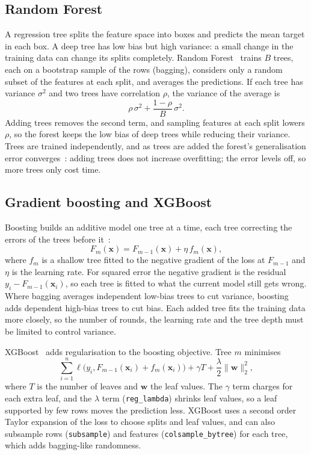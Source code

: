 \subsection{Random Forest}
A regression tree splits the feature space into boxes and predicts the mean
target in each box. A deep tree has low bias but high variance: a small
change in the training data can change its splits completely. Random
Forest~\cite{breiman2001rf} trains $B$ trees, each on a bootstrap sample of
the rows (bagging), considers only a random subset of the features at each
split, and averages the predictions. If each tree has variance $\sigma^2$
and two trees have correlation $\rho$, the variance of the average is
\begin{equation}
\rho\,\sigma^2 + \frac{1-\rho}{B}\,\sigma^2 .
\end{equation}
Adding trees removes the second term, and sampling features at each split
lowers $\rho$, so the forest keeps the low bias of deep trees while
reducing their variance. Trees are trained independently, and as trees
are added the forest's generalisation error converges~\cite{breiman2001rf}:
adding trees does not increase overfitting; the error levels off, so more
trees only cost time.

\subsection{Gradient boosting and XGBoost}
Boosting builds an additive model one tree at a time, each tree correcting
the errors of the trees before it~\cite{friedman2001gbm}:
\begin{equation}
F_m(\mathbf{x}) = F_{m-1}(\mathbf{x}) + \eta\, f_m(\mathbf{x}),
\end{equation}
where $f_m$ is a shallow tree fitted to the negative gradient of the loss
at $F_{m-1}$ and $\eta$ is the learning rate. For squared error the
negative gradient is the residual $y_i - F_{m-1}(\mathbf{x}_i)$, so each
tree is fitted to what the current model still gets wrong. Where bagging
averages independent low-bias trees to cut variance, boosting adds
dependent high-bias trees to cut bias. Each added tree fits the training
data more closely, so the number of rounds, the learning rate and the tree
depth must be limited to control variance.

XGBoost~\cite{chen2016xgboost} adds regularisation to the boosting
objective. Tree $m$ minimises
\begin{equation}
\sum_{i=1}^{n} \ell\bigl(y_i, F_{m-1}(\mathbf{x}_i) + f_m(\mathbf{x}_i)\bigr)
+ \gamma T + \frac{\lambda}{2}\lVert\mathbf{w}\rVert_2^2 ,
\end{equation}
where $T$ is the number of leaves and $\mathbf{w}$ the leaf values. The
$\gamma$ term charges for each extra leaf, and the $\lambda$ term
(\texttt{reg\_lambda}) shrinks leaf values, so a leaf supported by few rows
moves the prediction less. XGBoost uses a second order Taylor expansion of
the loss to choose splits and leaf values, and can also subsample rows
(\texttt{subsample}) and features (\texttt{colsample\_bytree}) for each
tree, which adds bagging-like randomness.

